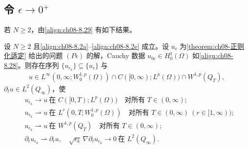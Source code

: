 \documentclass[../../main.tex]{subfiles}%
\begin{document}
\subsection{令 $\epsilon\to0^+$}\label{subsection:ch08-极限过程}

若 $N\geqslant2$，由\eqref{align:ch08-8.29} 有如下结果。

\begin{proposition}\label{proposition:ch08-收敛N2}
设 $N\geqslant2$ 且\eqref{align:ch08-8.2a}--\eqref{align:ch08-8.2e} 成立。设 $u_\epsilon$ 为\cref{theorem:ch08-正则化适定} 给出的问题 $(P\epsilon)$ 的解，Cauchy 数据 $u_{0\epsilon}\in H^1_0(\Omega)$ 如\eqref{align:ch08-8.28}。则存在序列 $\{u_{\epsilon_k}\}\subseteq\{u_\epsilon\}$ 与
\begin{align*}
u\in L^\infty(0,\infty;W^{1,p}_0(\Omega))\cap C([0,\infty);L^p(\Omega))\cap W^{1,p}(Q_T),
\end{align*}
$\partial_t u\in L^2(Q_\infty)$，使
\begin{align}
&u_{\epsilon_k}\to u\ \text{在 }C([0,T);L^p(\Omega))\quad\text{对所有 }T\in(0,\infty); \label{align:ch08-8.36a}\\
&u_{\epsilon_k}\rightharpoonup u\ \text{在 }L^r(0,T;W^{1,p}_0(\Omega))\quad\text{对所有 }T\in(0,\infty)\ (r\in[1,\infty)); \label{align:ch08-8.36b}\\
&u_{\epsilon_k}\rightharpoonup u\ \text{在 }W^{1,p}(Q_T)\quad\text{对所有 }T\in(0,\infty); \label{align:ch08-8.36c}\\
&\partial_t u_{\epsilon_k}\rightharpoonup\partial_t u,\quad
\sqrt{\epsilon_k}\,\nabla\partial_t u_{\epsilon_k}\to0\ \text{在 }L^2(Q_\infty). \label{align:ch08-8.36d}
\end{align}
\end{proposition}
\end{document}
